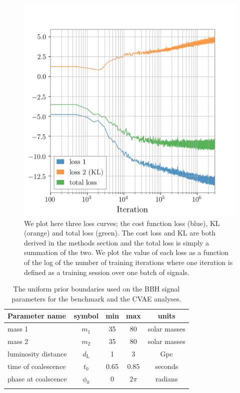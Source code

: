 \documentclass[%
showpacs,
 amsmath,amssymb,
 aps,
 twocolumn,
 prl,
 reprint,
floatfix,
]{revtex4-1}
\begin{document}
%
%
\begin{figure}
    \includegraphics[width=\columnwidth]{images/inv_losses_log.png}
\caption{\label{fig:loss_log} We plot here three loss curves; the cost
function loss (blue), KL (orange) and total loss (green). The cost  loss and KL
are both derived in the methods section and the total loss is simply a
summation of the two. We plot the value of each loss as a function of the log
of the number of training iterations where one iteration is defined as a
training session over one batch of signals.} %
\end{figure}

%
%
\begin{table}
\centering
\caption{The uniform prior boundaries used on the \ac{BBH} signal parameters for the benchmark
and the \ac{CVAE} analyses.}
\begin{tabular}[t]{lcccc}
\toprule
Parameter name & symbol & min & max & units \\
\hline
mass 1 & $m_1$ & 35 & 80 & solar masses \\
mass 2 & $m_2$ & 35 & 80 & solar masses \\
luminosity distance & $d_{\text{L}}$ & 1 & 3 & Gpc \\
time of coalescence & $t_{0}$ & 0.65 & 0.85 & seconds \\
phase at coalscence & $\phi_{0}$ & 0 & $2\pi$ & radians \\
\botrule
\end{tabular}
\label{tab:prior_ranges}
\end{table}
\end{document}
